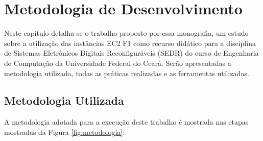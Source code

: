 \chapter{Metodologia de Desenvolvimento}
\label{chap:metodologia}

Neste capítulo detalha-se o trabalho proposto por essa monografia, um estudo sobre a utilização das instâncias EC2 F1 como recurso didático para a disciplina de Sistemas Eletrônicos Digitais Reconfiguráveis (SEDR) do curso de Engenharia de Computação da Universidade Federal do Ceará. Serão apresentadas a metodologia utilizada, todas as práticas realizadas e as ferramentas utilizadas.

\section{Metodologia Utilizada}\label{sec: metodologia-utilizada}

A metodologia adotada para a execução deste trabalho é mostrada nas etapas mostradas da Figura \ref{fig:metodologia}:



\begin{figure}[htb!] 
   	    \captionsetup{width=15cm}%
		\Caption{\label{fig:metodologia}{Metodologia}}
\end{figure}
    
